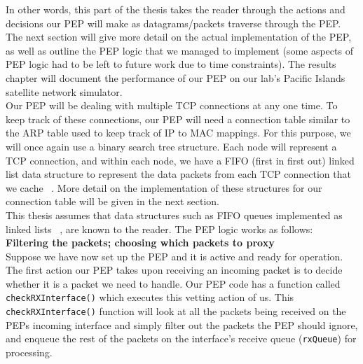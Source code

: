 In other words, this part of the thesis takes the reader through the actions and decisions our PEP will make as datagrams/packets traverse through the PEP. The next section will give more detail on the actual implementation of the PEP, as well as outline the PEP logic that we managed to implement (some aspects of PEP logic had to be left to future work due to time constraints). The results chapter will document the performance of our PEP on our lab's Pacific Islands satellite network simulator.\\

Our PEP will be dealing with multiple TCP connections at any one time. To keep track of these connections, our PEP will need a connection table similar to the ARP table used to keep track of IP to MAC mappings. For this purpose, we will once again use a binary search tree structure. Each node will represent a TCP connection, and within each node, we have a FIFO (first in first out) linked list data structure to represent the data packets from each TCP connection that we cache ~\cite{43}. More detail on the implementation of these structures for our connection table will be given in the next section. \\

This thesis assumes that data structures such as FIFO queues implemented as linked lists ~\cite{43}, are known to the reader. The PEP logic works as follows: \\

\noindent \textbf{Filtering the packets; choosing which packets to proxy} \\
Suppose we have now set up the PEP and it is active and ready for operation. The first action our PEP takes upon receiving an incoming packet is to decide whether it is a packet we need to handle. Our PEP code has a function called {\tt checkRXInterface()} which executes this vetting action of us. This {\tt checkRXInterface()} function will look at all the packets being received on the PEPs incoming interface and simply filter out the packets the PEP should ignore, and enqueue the rest of the packets on the interface's receive queue ({\tt rxQueue}) for processing. \\ 

